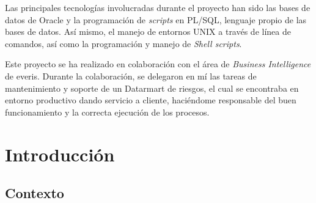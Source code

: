 \documentclass[a4paper, 12pt]{book}
\begin{document}
Las principales tecnologías involucradas durante el proyecto han sido las bases de datos de Oracle y la programación de \textit{scripts} en PL/SQL, lenguaje propio de las bases de datos. Así mismo, el manejo de entornos UNIX a través de línea de comandos, así como la programación y manejo de \textit{Shell scripts}.

Este proyecto se ha realizado en colaboración con el área de \textit{Business Intelligence} de everis. Durante la colaboración, se delegaron en mí las tareas de mantenimiento y soporte de un Datarmart de riesgos, el cual se encontraba en entorno productivo dando servicio a cliente, haciéndome responsable del buen funcionamiento y la correcta ejecución de los procesos.




\tableofcontents 
\cleardoublepage
\listoffigures %


\cleardoublepage
\chapter{Introducción}
\label{sec:intro} %

\section{Contexto}
\label{sec:Contexto}
\end{document}
